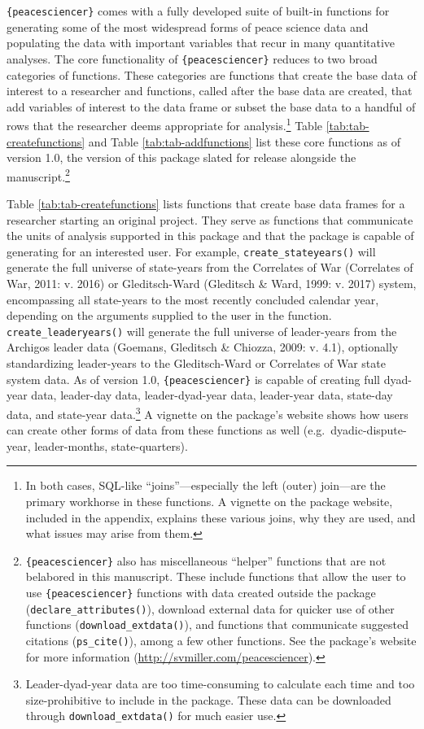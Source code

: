 \documentclass[
  11pt,
]{article}
\begin{document}
\texttt{\{peacesciencer\}} comes with a fully developed suite of built-in functions for generating some of the most widespread forms of peace science data and populating the data with important variables that recur in many quantitative analyses. The core functionality of \texttt{\{peacesciencer\}} reduces to two broad categories of functions. These categories are functions that create the base data of interest to a researcher and functions, called after the base data are created, that add variables of interest to the data frame or subset the base data to a handful of rows that the researcher deems appropriate for analysis.\footnote{In both cases, SQL-like ``joins''---especially the left (outer) join---are the primary workhorse in these functions. A vignette on the package website, included in the appendix, explains these various joins, why they are used, and what issues may arise from them.} Table \ref{tab:tab-createfunctions} and Table \ref{tab:tab-addfunctions} list these core functions as of version 1.0, the version of this package slated for release alongside the manuscript.\footnote{\texttt{\{peacesciencer\}} also has miscellaneous ``helper'' functions that are not belabored in this manuscript. These include functions that allow the user to use \texttt{\{peacesciencer\}} functions with data created outside the package (\texttt{declare\_attributes()}), download external data for quicker use of other functions (\texttt{download\_extdata()}), and functions that communicate suggested citations (\texttt{ps\_cite()}), among a few other functions. See the package's website for more information (\url{http://svmiller.com/peacesciencer}).}

Table \ref{tab:tab-createfunctions} lists functions that create base data frames for a researcher starting an original project. They serve as functions that communicate the units of analysis supported in this package and that the package is capable of generating for an interested user. For example, \texttt{create\_stateyears()} will generate the full universe of state-years from the Correlates of War (Correlates of War, 2011: v. 2016) or Gleditsch-Ward (Gleditsch \& Ward, 1999: v. 2017) system, encompassing all state-years to the most recently concluded calendar year, depending on the arguments supplied to the user in the function. \texttt{create\_leaderyears()} will generate the full universe of leader-years from the Archigos leader data (Goemans, Gleditsch \& Chiozza, 2009: v. 4.1), optionally standardizing leader-years to the Gleditsch-Ward or Correlates of War state system data. As of version 1.0, \texttt{\{peacesciencer\}} is capable of creating full dyad-year data, leader-day data, leader-dyad-year data, leader-year data, state-day data, and state-year data.\footnote{Leader-dyad-year data are too time-consuming to calculate each time and too size-prohibitive to include in the package. These data can be downloaded through \texttt{download\_extdata()} for much easier use.} A vignette on the package's website shows how users can create other forms of data from these functions as well (e.g.~dyadic-dispute-year, leader-months, state-quarters).
\end{document}
